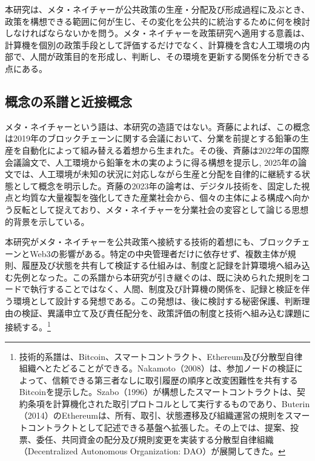本研究は、メタ・ネイチャーが公共政策の生産・分配及び形成過程に及ぶとき、政策を構想できる範囲に何が生じ、その変化を公共的に統治するために何を検討しなければならないかを問う。メタ・ネイチャーを政策研究へ適用する意義は、計算機を個別の政策手段として評価するだけでなく、計算機を含む人工環境の内部で、人間が政策目的を形成し、判断し、その環境を更新する関係を分析できる点にある。

\subsection{概念の系譜と近接概念}
\label{subsec:intro_metanature_lineage}

メタ・ネイチャーという語は、本研究の造語ではない。斉藤によれば、この概念は2019年のブロックチェーンに関する会議において、分業を前提とする鉛筆の生産を自動化によって組み替える着想から生まれた。その後、斉藤は2022年の国際会議論文で、人工環境から鉛筆を木の実のように得る構想を提示し\cite{saito2022path}, 2025年の論文では、人工環境が未知の状況に対応しながら生産と分配を自律的に継続する状態として概念を明示した\cite{saito2025metanature}。斉藤の2023年の論考は、デジタル技術を、固定した視点と均質な大量複製を強化してきた産業社会から、個々の主体による構成へ向かう反転として捉えており、メタ・ネイチャーを分業社会の変容として論じる思想的背景を示している\cite{saito2023reversegutenberg}。

本研究がメタ・ネイチャーを公共政策へ接続する技術的着想にも、ブロックチェーンとWeb3の影響がある。特定の中央管理者だけに依存せず、複数主体が規則、履歴及び状態を共有して検証する仕組みは、制度と記録を計算環境へ組み込む先例となった\cite{olnes2017blockchain,janssen2020blockchain}。この系譜から本研究が引き継ぐのは、既に決められた規則をコードで執行することではなく、人間、制度及び計算機の関係を、記録と検証を伴う環境として設計する発想である。この発想は、後に検討する秘密保護、判断理由の検証、異議申立て及び責任配分を、政策評価の制度と技術へ組み込む課題に接続する。\footnote{技術的系譜は、Bitcoin、スマートコントラクト、Ethereum及び分散型自律組織へとたどることができる。Nakamoto（2008）は、参加ノードの検証によって、信頼できる第三者なしに取引履歴の順序と改変困難性を共有するBitcoinを提示した\cite{nakamoto2008bitcoin}。Szabo（1996）が構想したスマートコントラクトは、契約条項を計算機化された取引プロトコルとして実行するものであり\cite{szabo1996smartcontracts}、Buterin（2014）のEthereumは、所有、取引、状態遷移及び組織運営の規則をスマートコントラクトとして記述できる基盤へ拡張した\cite{buterin2014ethereum}。その上では、提案、投票、委任、共同資金の配分及び規則変更を実装する分散型自律組織（Decentralized Autonomous Organization: DAO）が展開してきた\cite{hassan2021dao,hsieh2018dao}。}

